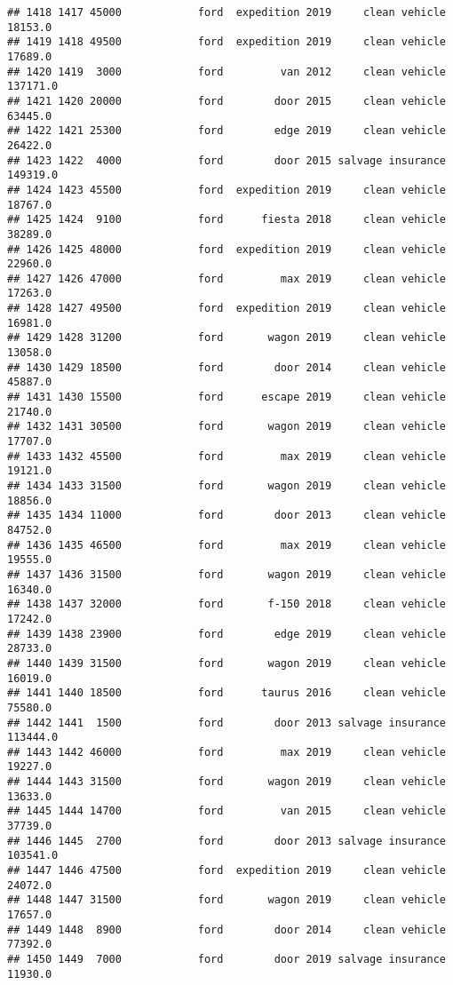 \documentclass[
]{article}
\begin{document}
\begin{verbatim}
## 1418 1417 45000            ford  expedition 2019     clean vehicle   18153.0
## 1419 1418 49500            ford  expedition 2019     clean vehicle   17689.0
## 1420 1419  3000            ford         van 2012     clean vehicle  137171.0
## 1421 1420 20000            ford        door 2015     clean vehicle   63445.0
## 1422 1421 25300            ford        edge 2019     clean vehicle   26422.0
## 1423 1422  4000            ford        door 2015 salvage insurance  149319.0
## 1424 1423 45500            ford  expedition 2019     clean vehicle   18767.0
## 1425 1424  9100            ford      fiesta 2018     clean vehicle   38289.0
## 1426 1425 48000            ford  expedition 2019     clean vehicle   22960.0
## 1427 1426 47000            ford         max 2019     clean vehicle   17263.0
## 1428 1427 49500            ford  expedition 2019     clean vehicle   16981.0
## 1429 1428 31200            ford       wagon 2019     clean vehicle   13058.0
## 1430 1429 18500            ford        door 2014     clean vehicle   45887.0
## 1431 1430 15500            ford      escape 2019     clean vehicle   21740.0
## 1432 1431 30500            ford       wagon 2019     clean vehicle   17707.0
## 1433 1432 45500            ford         max 2019     clean vehicle   19121.0
## 1434 1433 31500            ford       wagon 2019     clean vehicle   18856.0
## 1435 1434 11000            ford        door 2013     clean vehicle   84752.0
## 1436 1435 46500            ford         max 2019     clean vehicle   19555.0
## 1437 1436 31500            ford       wagon 2019     clean vehicle   16340.0
## 1438 1437 32000            ford       f-150 2018     clean vehicle   17242.0
## 1439 1438 23900            ford        edge 2019     clean vehicle   28733.0
## 1440 1439 31500            ford       wagon 2019     clean vehicle   16019.0
## 1441 1440 18500            ford      taurus 2016     clean vehicle   75580.0
## 1442 1441  1500            ford        door 2013 salvage insurance  113444.0
## 1443 1442 46000            ford         max 2019     clean vehicle   19227.0
## 1444 1443 31500            ford       wagon 2019     clean vehicle   13633.0
## 1445 1444 14700            ford         van 2015     clean vehicle   37739.0
## 1446 1445  2700            ford        door 2013 salvage insurance  103541.0
## 1447 1446 47500            ford  expedition 2019     clean vehicle   24072.0
## 1448 1447 31500            ford       wagon 2019     clean vehicle   17657.0
## 1449 1448  8900            ford        door 2014     clean vehicle   77392.0
## 1450 1449  7000            ford        door 2019 salvage insurance   11930.0

\end{verbatim}
\end{document}

